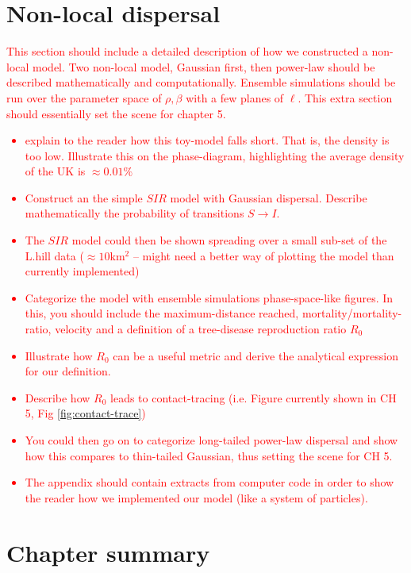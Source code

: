\section{Non-local dispersal}
\textcolor{red}{
This section should include a detailed description of how we constructed a non-local model. Two non-local model, Gaussian first, then power-law should be described mathematically and computationally. Ensemble simulations should be run over the parameter space of $\rho, \beta$ with a few planes of $\ell$. This extra section should essentially set the scene for chapter 5.
\begin{itemize}
    \item explain to the reader how this toy-model falls short. That is, the density is too low. Illustrate this on the phase-diagram, highlighting the average density of the UK is $\approx 0.01\%$
    \item Construct an the simple $SIR$ model with Gaussian dispersal. Describe mathematically the probability of transitions $S\rightarrow I$.
    \item The $SIR$ model could then be shown spreading over a small sub-set of the L.hill data ($\approx 10 \mathrm{km^2}$ -- might need a better way of plotting the model than currently implemented)
    \item Categorize the model with ensemble simulations phase-space-like figures. In this, you should include the maximum-distance reached, mortality/mortality-ratio, velocity and a definition of a tree-disease reproduction ratio $R_0$
    \item Illustrate how $R_0$ can be a useful metric and derive the analytical expression for our definition.
    \item Describe how $R_0$ leads to contact-tracing (i.e. Figure currently shown in CH 5, Fig \ref{fig:contact-trace})
    \item You could then go on to categorize long-tailed power-law dispersal and show how this compares to thin-tailed Gaussian, thus setting the scene for CH 5.
    \item The appendix should contain extracts from computer code in order to show the reader how we implemented our model (like a system of particles). 
\end{itemize}}

\section{Chapter summary}

